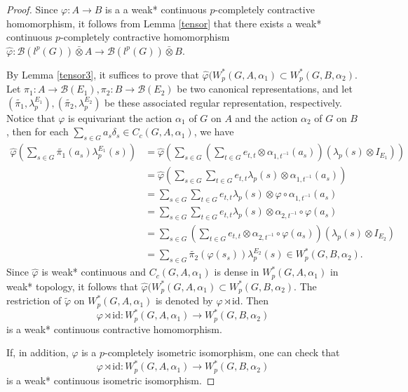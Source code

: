 \documentclass[reqno,11pt]{amsart}
\theoremstyle{plain}
\theoremstyle{definition}
\theoremstyle{remark}
\newcommand{\B}{\mathcal{B}}
\begin{document}
\begin{proof}
Since $\varphi:A\rightarrow B$ is a a weak* continuous $p$-completely contractive homomorphism, it follows from Lemma \ref{tensor} that there exists a  weak* continuous $p$-completely contractive homomorphism $\hat{\varphi}:\B(l^p(G))\bar{\otimes}A\rightarrow \B(l^p(G))\bar{\otimes}B$.


By Lemma \ref{tensor3}, it suffices to prove that $\hat{\varphi}(W^*_p(G,A,\alpha_1)\subset W^*_p(G,B,\alpha_2)$.
Let $\pi_1:A\rightarrow \mathcal{B}(E_1), \pi_2:B\rightarrow \mathcal{B}(E_2)$ be two canonical representations, and let $(\widetilde{\pi_1},\lambda_p^{E_1}), (\widetilde{\pi_2},\lambda_p^{E_2})$ be these associated regular representation, respectively.
Notice that $\varphi$ is equivariant the action $\alpha_1$ of $G$ on $A$ and the action $\alpha_2$ of $G$ on $B$, then for each $\sum_{s\in G}a_s\delta_s\in C_c(G,A,\alpha_1)$, we have
$$\begin{aligned} \hat{\varphi}(\sum_{s\in G}\widetilde{\pi_1}(a_s)\lambda_p^{E_1}(s)) &=
\hat{\varphi}\left(\sum_{s\in G}\left(\sum_{t\in G} e_{t,t}\otimes \alpha_{1,t^{-1}}(a_s)\right)\left(\lambda_p(s)\otimes I_{E_1}\right)\right)\\
 &=\hat{\varphi}\left(\sum_{s\in G}\sum_{t\in G} e_{t,t}\lambda_p(s)\otimes \alpha_{1,t^{-1}}(a_s)\right)\\
 &=\sum_{s\in G}\sum_{t\in G} e_{t,t}\lambda_p(s)\otimes \varphi\circ\alpha_{1,t^{-1}}(a_s)\\
 &=\sum_{s\in G}\sum_{t\in G} e_{t,t}\lambda_p(s)\otimes \alpha_{2,t^{-1}}\circ\varphi(a_s)\\
 &=\sum_{s\in G}\left(\sum_{t\in G}e_{t,t}\otimes\alpha_{2,t^{-1}}\circ\varphi(a_s)\right)\left(\lambda_p(s)\otimes I_{E_2}\right)\\
 &=\sum_{s\in G}\widetilde{\pi_2}(\varphi(s_s))\lambda_p^{E_2}(s)\in W^*_p(G,B,\alpha_2).\end{aligned}$$
Since $\hat{\varphi}$ is weak* continuous and $C_c(G,A,\alpha_1)$ is dense in $W^*_p(G,A,\alpha_1)$ in weak* topology, it follows that  $\hat{\varphi}(W^*_p(G,A,\alpha_1)\subset W^*_p(G,B,\alpha_2)$. The restriction of $\widetilde{\varphi}$ on $W^*_p(G,A,\alpha_1)$ is denoted by $\varphi\rtimes \mathrm{id}$. Then $$\varphi\rtimes\mathrm{id}:W^*_p(G,A,\alpha_1)\rightarrow W^*_p(G,B,\alpha_2)$$ is a weak* continuous contractive homomorphism.

 If, in addition, $\varphi$ is a $p$-completely isometric isomorphism, one can check that $$\varphi\rtimes\mathrm{id}:W^*_p(G,A,\alpha_1)\rightarrow W^*_p(G,B,\alpha_2)$$ is a weak* continuous isometric isomorphism.
\end{proof}
\end{document}

